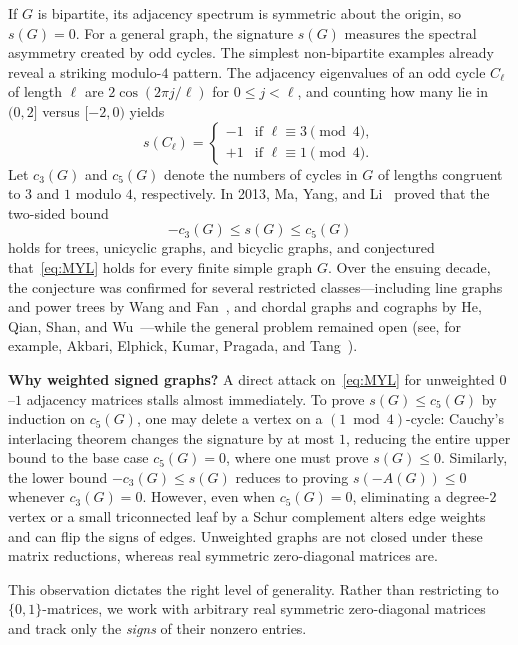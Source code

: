 \documentclass[10pt,letterpaper]{article}
\theoremstyle{zetaplain}
\theoremstyle{zetadef}
\theoremstyle{remark}
\numberwithin{equation}{section}
\begin{document}
If $G$ is bipartite, its adjacency spectrum is symmetric about the origin, so $s(G) = 0$. For a general graph, the signature $s(G)$ measures the spectral asymmetry created by odd cycles. The simplest non-bipartite examples already reveal a striking modulo-$4$ pattern. The adjacency eigenvalues of an odd cycle $C_\ell$ of length $\ell$ are $2\cos(2\pi j / \ell)$ for $0 \le j < \ell$, and counting how many lie in $(0, 2]$ versus $[-2, 0)$ yields
\[
  s(C_\ell) =
  \begin{cases}
    -1 & \text{if } \ell \equiv 3 \pmod 4, \\
    +1 & \text{if } \ell \equiv 1 \pmod 4.
  \end{cases}
\]
Let $c_3(G)$ and $c_5(G)$ denote the numbers of cycles in $G$ of lengths congruent to $3$ and $1$ modulo $4$, respectively. In 2013, Ma, Yang, and Li~\cite{MYL13} proved that the two-sided bound
\begin{equation}\label{eq:MYL}
  -c_3(G) \le s(G) \le c_5(G)
\end{equation}
holds for trees, unicyclic graphs, and bicyclic graphs, and conjectured that~\eqref{eq:MYL} holds for every finite simple graph $G$. Over the ensuing decade, the conjecture was confirmed for several restricted classes—including line graphs and power trees by Wang and Fan~\cite{WF14}, and chordal graphs and cographs by He, Qian, Shan, and Wu~\cite{HQSW21}—while the general problem remained open (see, for example, Akbari, Elphick, Kumar, Pragada, and Tang~\cite[Conjecture~2.5]{AEKPT26}).

\medskip
\noindent\textbf{Why weighted signed graphs?}
A direct attack on~\eqref{eq:MYL} for unweighted $0$--$1$ adjacency matrices stalls almost immediately. To prove $s(G) \le c_5(G)$ by induction on $c_5(G)$, one may delete a vertex on a $(1 \bmod 4)$-cycle: Cauchy's interlacing theorem changes the signature by at most $1$, reducing the entire upper bound to the base case $c_5(G) = 0$, where one must prove $s(G) \le 0$. Similarly, the lower bound $-c_3(G) \le s(G)$ reduces to proving $s(-A(G)) \le 0$ whenever $c_3(G) = 0$. However, even when $c_5(G) = 0$, eliminating a degree-$2$ vertex or a small triconnected leaf by a Schur complement alters edge weights and can flip the signs of edges. Unweighted graphs are not closed under these matrix reductions, whereas real symmetric zero-diagonal matrices are.

This observation dictates the right level of generality. Rather than restricting to $\{0, 1\}$-matrices, we work with arbitrary real symmetric zero-diagonal matrices and track only the \emph{signs} of their nonzero entries.
\end{document}
